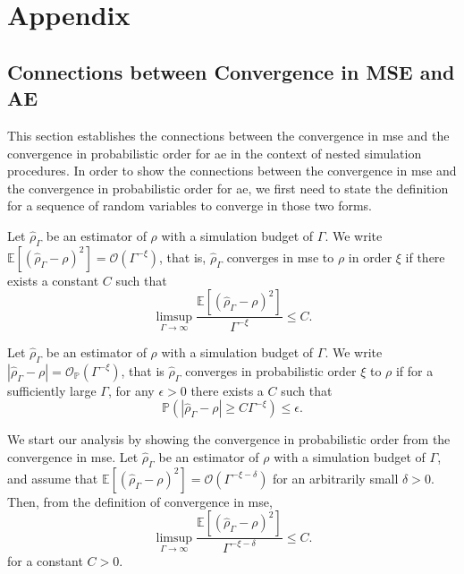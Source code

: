 \chapter*{Appendix} \label{chap:appendix}

\section{Connections between Convergence in MSE and AE}\label{appendix:connection-mse-absolute-error}

This section establishes the connections between the convergence in \gls{mse} and the convergence in probabilistic order for \gls{ae} in the context of nested simulation procedures.
In order to show the connections between the convergence in \gls{mse} and the convergence in probabilistic order for \gls{ae}, we first need to state the definition for a sequence of random variables to converge in those two forms.

\begin{definition}
    Let $\hat{\rho}_{\Gamma}$ be an estimator of $\rho$ with a simulation budget of $\Gamma$. 
    We write $\mathbb{E} \left[ \left(\hat{\rho}_{\Gamma} - \rho\right)^2 \right] = \mathcal{O} \left( \Gamma^{-\xi} \right)$, that is, $\hat{\rho}_{\Gamma}$ converges in \gls{mse} to $\rho$ in order $\xi$ if there exists a constant $C$ such that
    $$
        \limsup_{\Gamma \to \infty} \frac{\mathbb{E} \left[\left(\hat{\rho}_{\Gamma} - \rho\right)^2 \right]}{\Gamma^{-\xi}} \leq C.
    $$
\end{definition}

\begin{definition}
    Let $\hat{\rho}_{\Gamma}$ be an estimator of $\rho$ with a simulation budget of $\Gamma$. 
    We write $|\hat{\rho}_{\Gamma} - \rho| = \mathcal{O}_{\mathbb{P}}(\Gamma^{-\xi})$, that is $\hat{\rho}_{\Gamma}$ converges in probabilistic order $\xi$ to $\rho$ if for a sufficiently large $\Gamma$, for any $\epsilon > 0$ there exists a $C$ such that
    $$
         \mathbb{P} \left( \left| \hat{\rho}_{\Gamma} - \rho \right| \geq C \Gamma^{-\xi} \right) \leq \epsilon.
    $$
\end{definition}

We start our analysis by showing the convergence in probabilistic order from the convergence in \gls{mse}.
Let $\hat{\rho}_{\Gamma}$ be an estimator of $\rho$ with a simulation budget of $\Gamma$, and assume that $\mathbb{E} \left[ \left(\hat{\rho}_{\Gamma} - \rho\right)^2 \right] = \mathcal{O} \left( \Gamma^{-\xi-\delta} \right)$ for an arbitrarily small $\delta > 0$.
Then, from the definition of convergence in \gls{mse}, 
$$
    \limsup_{\Gamma \to \infty} \frac{\mathbb{E} \left[ \left(\hat{\rho}_{\Gamma} - \rho\right)^2 \right]}{\Gamma^{-\xi-\delta}} \leq C.
$$
for a constant $C > 0$.

